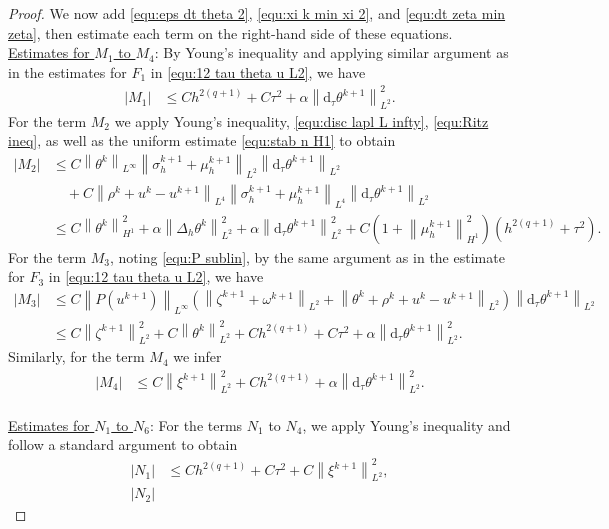 \documentclass[11pt, reqno]{amsart}
\theoremstyle{definition}
\numberwithin{equation}{section}
\newcommand{\dtt}{\mathrm{d}_\tau}
\newcommand{\norm}[2]{\left\|{#1}\right\|_{#2}}
\newcommand{\abs}[1]{\left|{#1}\right|}
\begin{document}
\begin{proof}
We now add \eqref{equ:eps dt theta 2}, \eqref{equ:xi k min xi 2}, and \eqref{equ:dt zeta min zeta}, then estimate each term on the right-hand side of these equations.
\\[2ex]
\underline{Estimates for $M_1$ to $M_4$}: By Young's inequality and applying similar argument as in the estimates for $F_1$ in \eqref{equ:12 tau theta u L2}, we have
\begin{align*}
	\abs{M_1} &\leq
	Ch^{2(q+1)}+C\tau^2 + \alpha \norm{\dtt \theta^{k+1}}{L^2}^2.
\end{align*}
For the term $M_2$ we apply Young's inequality, \eqref{equ:disc lapl L infty}, \eqref{equ:Ritz ineq}, as well as the uniform estimate \eqref{equ:stab n H1} to obtain
\begin{align*}
    \abs{M_2} 
    &\leq
    C\norm{\theta^k}{L^\infty} \norm{\sigma_h^{k+1}+\mu_h^{k+1}}{L^2} \norm{\dtt \theta^{k+1}}{L^2}
    \\
    &\quad
    +
    C\norm{\rho^k+u^k-u^{k+1}}{L^4}
    \norm{\sigma_h^{k+1}+\mu_h^{k+1}}{L^4} \norm{\dtt \theta^{k+1}}{L^2}
    \\
    &\leq
    C\norm{\theta^k}{H^1}^2 + \alpha \norm{\Delta_h \theta^k}{L^2}^2
    +
    \alpha \norm{\dtt \theta^{k+1}}{L^2}^2
    +
    C\left(1+\norm{\mu_h^{k+1}}{H^1}^2\right) (h^{2(q+1)}+ \tau^2).
\end{align*}
For the term $M_3$, noting \eqref{equ:P sublin}, by the same argument as in the estimate for $F_3$ in \eqref{equ:12 tau theta u L2}, we have
\begin{align*}
	\abs{M_3}
	&\leq
	C\norm{P(u^{k+1})}{L^\infty} \left(\norm{\zeta^{k+1}+\omega^{k+1}}{L^2} + \norm{\theta^k+\rho^k+u^k-u^{k+1}}{L^2} \right) \norm{\dtt \theta^{k+1}}{L^2}
	\\
	&\leq
	C \norm{\zeta^{k+1}}{L^2}^2 + C \norm{\theta^k}{L^2}^2 + Ch^{2(q+1)} + C\tau^2 + \alpha \norm{\dtt \theta^{k+1}}{L^2}^2.
\end{align*}
Similarly, for the term $M_4$ we infer
\begin{align*}
	\abs{M_4}
	&\leq
	C\norm{\xi^{k+1}}{L^2}^2 + Ch^{2(q+1)} + \alpha \norm{\dtt \theta^{k+1}}{L^2}^2.
\end{align*}
\\
\underline{Estimates for $N_1$ to $N_6$}: For the terms $N_1$ to $N_4$, we apply Young's inequality and follow a standard argument to obtain
\begin{align*}
    \abs{N_1}
    &\leq
    Ch^{2(q+1)}+ C\tau^2 + C\norm{\xi^{k+1}}{L^2}^2,
    \\
    \abs{N_2}

\end{align*}
\end{proof}
\end{document}
